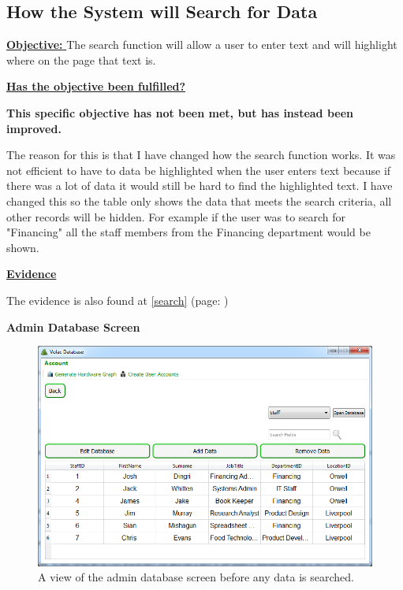 \subsection{How the System will Search for Data}

\underline{\textbf{Objective:} } The search function will allow a user to enter text and will highlight where on the page that text is.

\underline{\textbf{Has the objective been fulfilled?}}

\textbf{This specific objective has not been met, but has instead been improved.}

The reason for this is that I have changed how the search function works. It was not efficient to have to data be highlighted when the user enters text because if there was a lot of data it would still be hard to find the highlighted text. I have changed this so the table only shows the data that meets the search criteria, all other records will be hidden. For example if the user was to search for "Financing" all the staff members from the Financing department would be shown.

\underline{\textbf{Evidence}}

The evidence is also found at \ref{search} (page: \pageref{search}) 

\textbf{Admin Database Screen}

\begin{figure}[H]
    \includegraphics[width=\textwidth]{./Evaluation/Images/beforeadminsearch.png}
    \caption{A view of the admin database screen before any data is searched.} 
\end{figure}


